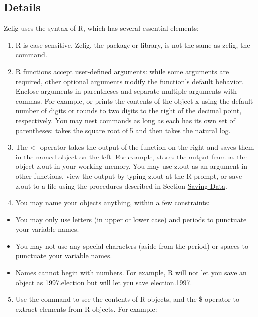 \documentclass[letterpaper,10pt,english]{sphinxmanual}
\begin{document}
\subsection{Details}
\label{3_data_analysis:details}
Zelig uses the syntax of R, which has several essential elements:
\begin{enumerate}
\item {} 
R is case sensitive. Zelig, the package or library, is not the same as zelig, the command.

\item {} 
R functions accept user-defined arguments: while some arguments are required, other optional arguments modify the function's default behavior. Enclose arguments in parentheses and separate multiple arguments with commas. For example,  or  prints the contents of the object x using the default number of digits or rounds to two digits to the right of the decimal point, respectively. You may nest commands as long as each has its own set of parentheses:  takes the square root of 5 and then takes the natural log.

\item {} 
The \textless{}- operator takes the output of the function on the right and saves them in the named object on the left. For example,  stores the output from  as the object z.out in your working memory. You may use z.out as an argument in other functions, view the output by typing z.out at the R prompt, or save z.out to a file using the procedures described in Section {\hyperref[3_data_analysis:saving-data]{Saving Data}}.

\item {} 
You may name your objects anything, within a few constraints:

\end{enumerate}
\begin{itemize}
\item {} 
You may only use letters (in upper or lower case) and periods to punctuate your variable names.

\item {} 
You may not use any special characters (aside from the period) or spaces to punctuate your variable names.

\item {} 
Names cannot begin with numbers. For example, R will not let you save an object as 1997.election but will let you save election.1997.

\end{itemize}
\begin{enumerate}
\setcounter{enumi}{4}
\item {} 
Use the  command to see the contents of R objects, and the \$ operator to extract elements from R objects. For example:

\end{enumerate}
\end{document}
